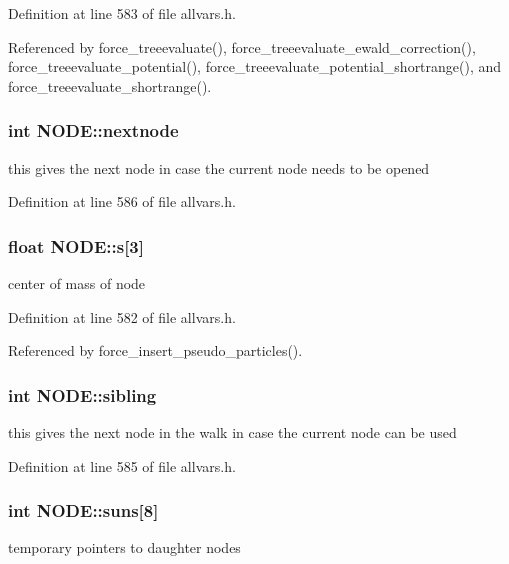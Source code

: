 Definition at line 583 of file allvars.h.



Referenced by force\_\-treeevaluate(), force\_\-treeevaluate\_\-ewald\_\-correction(), force\_\-treeevaluate\_\-potential(), force\_\-treeevaluate\_\-potential\_\-shortrange(), and force\_\-treeevaluate\_\-shortrange().

\hypertarget{structNODE_aabf4865245a8afbec1e1cb8e664f41e8}{
\subsubsection[{nextnode}]{\setlength{\rightskip}{0pt plus 5cm}int {\bf NODE::nextnode}}}
\label{structNODE_aabf4865245a8afbec1e1cb8e664f41e8}
this gives the next node in case the current node needs to be opened 

Definition at line 586 of file allvars.h.

\hypertarget{structNODE_a97ef917e39b0cc8a4aae6e6362c4b3bf}{
\subsubsection[{s}]{\setlength{\rightskip}{0pt plus 5cm}float {\bf NODE::s}\mbox{[}3\mbox{]}}}
\label{structNODE_a97ef917e39b0cc8a4aae6e6362c4b3bf}
center of mass of node 

Definition at line 582 of file allvars.h.



Referenced by force\_\-insert\_\-pseudo\_\-particles().

\hypertarget{structNODE_a0e5a3f58232208e4ad8570f801bf5713}{
\subsubsection[{sibling}]{\setlength{\rightskip}{0pt plus 5cm}int {\bf NODE::sibling}}}
\label{structNODE_a0e5a3f58232208e4ad8570f801bf5713}
this gives the next node in the walk in case the current node can be used 

Definition at line 585 of file allvars.h.

\hypertarget{structNODE_a2a31ed85a69cd67dce1861bd327ac6e9}{
\subsubsection[{suns}]{\setlength{\rightskip}{0pt plus 5cm}int {\bf NODE::suns}\mbox{[}8\mbox{]}}}
\label{structNODE_a2a31ed85a69cd67dce1861bd327ac6e9}
temporary pointers to daughter nodes 

